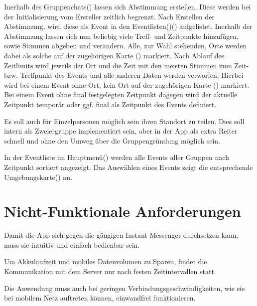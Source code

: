 \documentclass[parskip=full,11pt]{scrartcl}
\begin{document}
Inerhalb des Gruppenchats() lassen sich Abstimmung erstellen. Diese werden bei
der Initialisierung vom Ersteller zeitlich begrenzt. Nach Erstellen der Abstimmung, wird diese als Event in den
Eventlisten()() aufgelistet.
Inerhalb der Abstimmung lassen sich nun beliebig viele Treff- und Zeitpunkte hinzufügen,
sowie Stimmen abgeben und verändern. Alle, zur Wahl stehenden, Orte werden dabei als solche auf der zugehörigen
Karte () markiert. Nach Ablauf des Zeitlimits wird jeweils der Ort und die
Zeit mit den meisten Stimmen zum Zeit- bzw. Treffpunkt des Events und alle anderen Daten werden verworfen.
Hierbei wird bei einem Event ohne Ort, kein Ort auf der zugehörigen
Karte () markiert. Bei einem Event ohne final festgelegten Zeitpunkt
dagegen wird der aktuelle Zeitpunkt temporär oder ggf. final als Zeitpunkt des Events definiert.

Es soll auch für Einzelpersonen möglich sein ihren Standort zu teilen.
Dies soll intern als Zweiergruppe implementiert sein, aber in der App als extra Reiter schnell
und ohne den Umweg über die Gruppengründung möglich sein.

In der Eventliste im Hauptmenü() werden alle Events aller Gruppen nach
Zeitpunkt sortiert angezeigt. Das Auswählen eines Events zeigt die entsprechende
Umgebungskarte() an.

\section{Nicht-Funktionale Anforderungen}

Damit die App sich gegen die gängigen Instant Messenger durchsetzen kann, muss sie intuitiv und einfach bedienbar sein.

Um Akkulaufzeit und mobiles Datenvolumen zu Sparen, findet die Kommunikation mit dem Server nur nach festen Zeitintervallen statt.

Die Anwendung muss auch bei geringen Verbindungsgeschwindigkeiten, wie sie bei mobilem Netz auftreten können, einwandfrei funktionieren.
\end{document}
